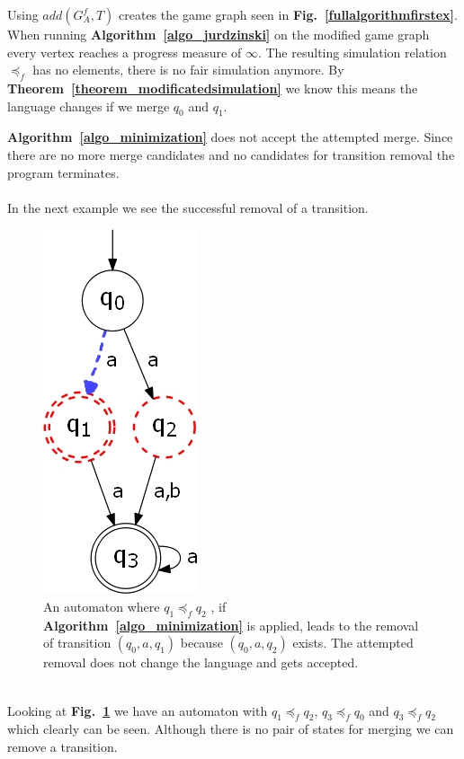 \documentclass[12pt,oneside,bibliography=totoc,abstracton]{scrartcl}
\newcommand{\figref}[1]{\textbf{Fig.~\ref{#1}}}
\newcommand{\theoremref}[1]{\textbf{Theorem~\ref{#1}}}
\newcommand{\algoref}[1]{\textbf{Algorithm~\ref{#1}}}
\begin{document}
Using $add(G^f_A, T)$ creates the game graph seen in \figref{fullalgorithmfirstex}.
When running \algoref{algo_jurdzinski} on the modified game graph every vertex reaches
a progress measure of $\infty$. The resulting simulation relation $\preceq_f$ has no elements,
there is no fair simulation anymore. By \theoremref{theorem_modificatedsimulation} we know this
means the language changes if we merge $q_0$ and $q_1$.

\algoref{algo_minimization} does not accept the attempted merge. Since there are no
more merge candidates and no candidates for transition removal the program terminates.\\\\
In the next example we see the successful removal of a transition.
\begin{figure}[ht]
	 \begin{center}
		\includegraphics[scale=0.5]{res/fullalgorithm_secondex}
	\end{center}
	\caption{An automaton where $q_1 \preceq_f q_2$ , if \algoref{algo_minimization} is applied,
	leads to the removal of transition $(q_0, a, q_1)$ because $(q_0, a, q_2)$ exists.
	The attempted removal does not change the language and gets accepted.}
	\label{fullalgorithmsecondex}
\end{figure}\quad\\
Looking at \figref{fullalgorithmsecondex} we have an automaton with $q_1 \preceq_f q_2$,
$q_3 \preceq_f q_0$ and $q_3 \preceq_f q_2$ which clearly can be seen.
Although there is no pair of states for merging we can remove a transition.
\end{document}
